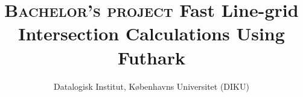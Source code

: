 
\usepackage[square,numbers]{natbib}

\title{
    \vspace{5cm}
    \Huge{\textsc{Bachelor's project}}
    \linebreak
    \Large{Fast Line-grid Intersection Calculations Using Futhark}
}
\author{Datalogisk Institut, Københavns Universitet (DIKU)}




\onehalfspacing


\newpage
\singlespacing
\thispagestyle{empty}
\tableofcontents
\newpage

\onehalfspacing
\setcounter{page}{1}







\label{sec:bench}
\newpage

\newpage


\newpage



